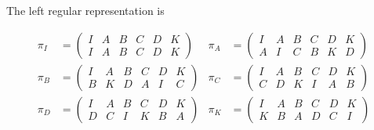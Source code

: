 \documentclass[twoside]{amsart}
\begin{document}
\begin{enumerate}[A.]
\begin{enumerate}[1]
      The left regular representation is

      \begin{align*}
         \pi_I &= 
            \begin{pmatrix}
               I & A & B & C & D & K \\
               I & A & B & C & D & K
            \end{pmatrix} &
         \pi_A &=
            \begin{pmatrix}
               I & A & B & C & D & K \\
               A & I & C & B & K & D
            \end{pmatrix} \\
         \pi_B &= 
            \begin{pmatrix}
               I & A & B & C & D & K \\
               B & K & D & A & I & C
            \end{pmatrix} &
         \pi_C &=
            \begin{pmatrix}
               I & A & B & C & D & K \\
               C & D & K & I & A & B
            \end{pmatrix} \\
         \pi_D &= 
            \begin{pmatrix}
               I & A & B & C & D & K \\
               D & C & I & K & B & A
            \end{pmatrix} &
         \pi_K &=
            \begin{pmatrix}
               I & A & B & C & D & K \\
               K & B & A & D & C & I
            \end{pmatrix} 
      \end{align*}


\end{enumerate}
\end{enumerate}
\end{document}
